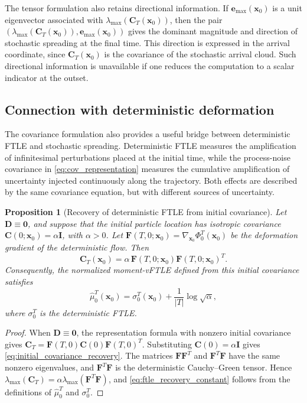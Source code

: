 \documentclass[a4paper,11pt]{article}
\numberwithin{equation}{section}
\theoremstyle{plain}
\newtheorem{proposition}[theorem]{Proposition}
\theoremstyle{definition}
\theoremstyle{remark}
\newcommand{\bx}{\mathbf{x}}
\newcommand{\be}{\mathbf{e}}
\newcommand{\bC}{\mathbf{C}}
\newcommand{\bD}{\mathbf{D}}
\newcommand{\bF}{\mathbf{F}}
\newcommand{\bI}{\mathbf{I}}
\newcommand{\bzero}{\mathbf{0}}
\newcommand{\lmax}{\lambda_{\max}}
\newcommand{\flow}[2]{\Phi_{#1}^{#2}}
\begin{document}
The tensor formulation also retains directional information.  If \(\be_{\max}(\bx_0)\) is a unit eigenvector associated with \(\lmax(\bC_T(\bx_0))\), then the pair \((\lmax(\bC_T(\bx_0)),\be_{\max}(\bx_0))\) gives the dominant magnitude and direction of stochastic spreading at the final time.  This direction is expressed in the arrival coordinate, since \(\bC_T(\bx_0)\) is the covariance of the stochastic arrival cloud.  Such directional information is unavailable if one reduces the computation to a scalar indicator at the outset.


\subsection{Connection with deterministic deformation}\label{sec:deformation_connection}

The covariance formulation also provides a useful bridge between deterministic FTLE and stochastic spreading.  Deterministic FTLE measures the amplification of infinitesimal perturbations placed at the initial time, while the process-noise covariance in \eqref{eq:cov_representation} measures the cumulative amplification of uncertainty injected continuously along the trajectory.  Both effects are described by the same covariance equation, but with different sources of uncertainty.

\begin{proposition}[Recovery of deterministic FTLE from initial covariance]\label{prop:ftle_initial_covariance}
Let \(\bD\equiv \bzero\), and suppose that the initial particle location has isotropic covariance \(\bC(0;\bx_0)=\alpha\bI\), with \(\alpha>0\).  Let \(\bF(T,0;\bx_0)=\nabla_{\bx_0}\flow{0}{T}(\bx_0)\) be the deformation gradient of the deterministic flow.  Then
\begin{equation}
    \bC_T(\bx_0)
    =
    \alpha\,\bF(T,0;\bx_0)\bF(T,0;\bx_0)^T .
    \label{eq:initial_covariance_recovery}
\end{equation}
Consequently, the normalized moment-vFTLE defined from this initial covariance satisfies
\begin{equation}
    \widehat{\mu}_0^T(\bx_0)
    =
    \sigma_0^T(\bx_0)
    +
    \frac{1}{|T|}\log\sqrt{\alpha},
    \label{eq:ftle_recovery_constant}
\end{equation}
where \(\sigma_0^T\) is the deterministic FTLE.
\end{proposition}

\begin{proof}
When \(\bD\equiv\bzero\), the representation formula with nonzero initial covariance gives \(\bC_T=\bF(T,0)\bC(0)\bF(T,0)^T\).  Substituting \(\bC(0)=\alpha\bI\) gives \eqref{eq:initial_covariance_recovery}.  The matrices \(\bF\bF^T\) and \(\bF^T\bF\) have the same nonzero eigenvalues, and \(\bF^T\bF\) is the deterministic Cauchy--Green tensor.  Hence \(\lmax(\bC_T)=\alpha\lmax(\bF^T\bF)\), and \eqref{eq:ftle_recovery_constant} follows from the definitions of \(\widehat{\mu}_0^T\) and \(\sigma_0^T\).
\end{proof}
\end{document}
